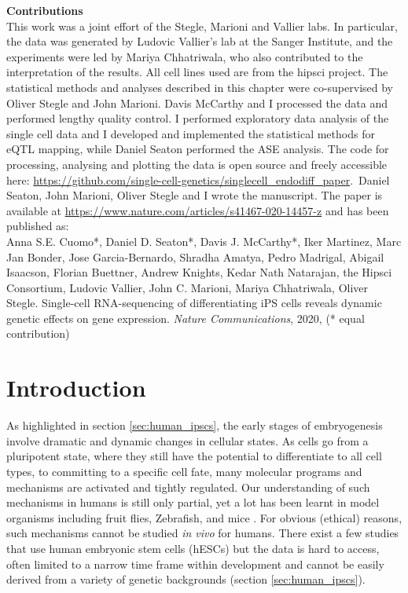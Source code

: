 \begin{Comment2}
\hspace{-3mm}\textbf{Contributions} \\
This work was a joint effort of the Stegle, Marioni and Vallier labs. 
In particular, the data was generated by Ludovic Vallier’s lab at the Sanger Institute, and the experiments were led by Mariya Chhatriwala, who also contributed to the interpretation of the results. 
All cell lines used are from the \gls{hipsci} project.
The statistical methods and analyses described in this chapter were co-supervised by Oliver Stegle and John Marioni. 
Davis McCarthy and I processed the data and performed lengthy quality control.
I performed exploratory data analysis of the single cell data and I developed and implemented the statistical methods for eQTL mapping, while Daniel Seaton performed the ASE analysis.
The code for processing, analysing and plotting the data is open source and freely accessible here: \url{https://github.com/single-cell-genetics/singlecell\_endodiff\_paper}.\
Daniel Seaton, John Marioni, Oliver Stegle and I wrote the manuscript. 
The paper \cite{cuomo2020single} is available at \url{https://www.nature.com/articles/s41467-020-14457-z} and has been published as:\\

Anna S.E. Cuomo*, Daniel D. Seaton*, Davis J. McCarthy*, Iker Martinez, Marc Jan Bonder, Jose Garcia-Bernardo, Shradha Amatya, Pedro Madrigal, Abigail Isaacson, Florian Buettner, Andrew Knights, Kedar Nath Natarajan, the Hipsci Consortium, Ludovic Vallier, John C. Marioni, Mariya Chhatriwala, Oliver Stegle. Single-cell RNA-sequencing of differentiating iPS cells reveals dynamic genetic effects on gene expression. \textit{Nature Communications}, 2020, (* equal contribution)

\end{Comment2}

\newpage

\section{Introduction}

As highlighted in section \ref{sec:human_ipscs}, the early stages of embryogenesis involve dramatic and dynamic changes in cellular states. 
As cells go from a pluripotent state, where they still have the potential to differentiate to all cell types, to committing to a specific cell fate, many molecular programs and mechanisms are activated and tightly regulated.
Our understanding of such mechanisms in humans is still only partial, yet a lot has been learnt in model organisms including fruit flies, Zebrafish, and mice \cite{}. 
For obvious (ethical) reasons, such mechanisms cannot be studied \textit{in vivo} for humans. 
There exist a few studies that use human embryonic stem cells (hESCs) but the data is hard to access, often limited to a narrow time frame within development and cannot be easily derived from a variety of genetic backgrounds \cite{} (section \ref{sec:human_ipscs}). \\

